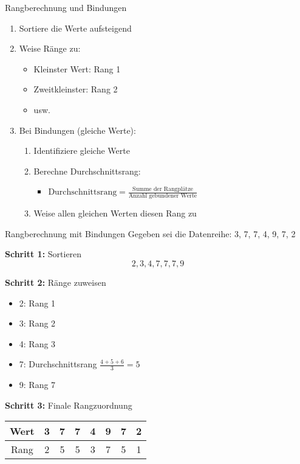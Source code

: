 \begin{KR}{Rangberechnung und Bindungen}
\begin{enumerate}
    \item Sortiere die Werte aufsteigend
    \item Weise Ränge zu:
        \begin{itemize}
            \item Kleinster Wert: Rang 1
            \item Zweitkleinster: Rang 2
            \item usw.
        \end{itemize}
    \item Bei Bindungen (gleiche Werte):
        \begin{enumerate}
            \item Identifiziere gleiche Werte
            \item Berechne Durchschnittsrang:
                \begin{itemize}
                    \item $\text{Durchschnittsrang} = \frac{\text{Summe der Rangplätze}}{\text{Anzahl gebundener Werte}}$
                \end{itemize}
            \item Weise allen gleichen Werten diesen Rang zu
        \end{enumerate}
\end{enumerate}
\end{KR}

\begin{example2}{Rangberechnung mit Bindungen}
Gegeben sei die Datenreihe: 3, 7, 7, 4, 9, 7, 2

\textbf{Schritt 1:} Sortieren
$$2, 3, 4, 7, 7, 7, 9$$

\textbf{Schritt 2:} Ränge zuweisen
\begin{itemize}
    \item 2: Rang 1
    \item 3: Rang 2
    \item 4: Rang 3
    \item 7: Durchschnittsrang $\frac{4+5+6}{3} = 5$
    \item 9: Rang 7
\end{itemize}

\textbf{Schritt 3:} Finale Rangzuordnung
\begin{center}
\begin{tabular}{|c|c|c|c|c|c|c|c|}
\hline
Wert & 3 & 7 & 7 & 4 & 9 & 7 & 2 \\
\hline
Rang & 2 & 5 & 5 & 3 & 7 & 5 & 1 \\
\hline
\end{tabular}
\end{center}
\end{example2}

